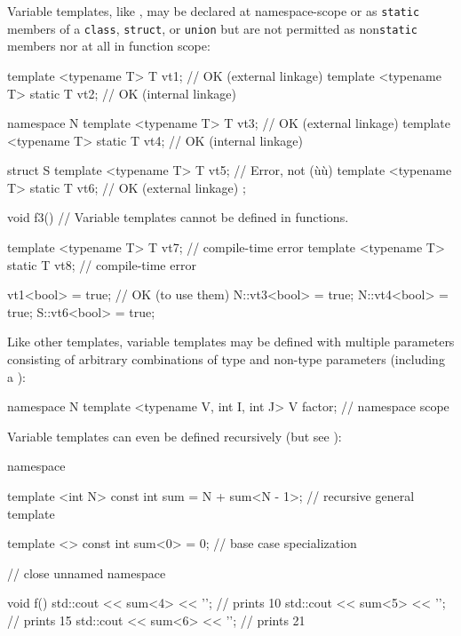 \noindent Variable templates, like , may be declared at
namespace-scope or as \lstinline!static! members of a
\lstinline!class!, \lstinline!struct!, or \lstinline!union! but are not
permitted as non\lstinline!static! members nor at all in function scope:

\begin{emcppslisting}[language=C++]
template <typename T> T vt1;             // OK (external linkage)
template <typename T> static T vt2;      // OK (internal linkage)

namespace N
{
    template <typename T> T vt3;           // OK (external linkage)
    template <typename T> static T vt4;    // OK (internal linkage)
}

struct S
{
    template <typename T> T vt5;         // Error, not (ù{}ù)
    template <typename T> static T vt6;  // OK (external linkage)
};

void f3()  // Variable templates cannot be defined in functions.
{
    template <typename T> T vt7;         // compile-time error
    template <typename T> static T vt8;  // compile-time error

    vt1<bool> = true;                   // OK (to use them)                  
    N::vt3<bool> = true;                                                        
    N::vt4<bool> = true;                                                        
    S::vt6<bool> = true;  
}
\end{emcppslisting}
    
\noindent Like other templates, variable templates may be defined with multiple
parameters consisting of arbitrary combinations of type and non-type
parameters (including a ):

\begin{emcppslisting}[language=C++]
namespace N
{
    template <typename V, int I, int J> V factor;  // namespace scope
}
\end{emcppslisting}
    
\noindent Variable templates can even be defined recursively (but see ): 

\begin{emcppslisting}[language=C++]
namespace {
template <int N>
const int sum = N + sum<N - 1>;    // recursive general template

template <> const int sum<0> = 0;  // base case specialization
}  // close unnamed namespace

void f()
{
    std::cout << sum<4> << '\n';  // prints 10
    std::cout << sum<5> << '\n';  // prints 15
    std::cout << sum<6> << '\n';  // prints 21
}
\end{emcppslisting}
    
